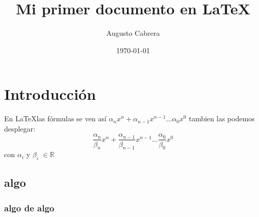 \documentclass[]{article}
\title{Mi primer documento en \LaTeX}
\author{Augusto Cabrera}
\date{\today}
\begin{document}
\maketitle

\section{Introducción}

En \LaTeX las fórmulas se ven así $\alpha_{n} x^n+\alpha_{n-1}x^{n-1}\dots\alpha_{0}x^{0}$ tambien las podemos desplegar:
$$
\frac{\alpha_{n}}{\beta_{n}}x^n+\frac{\alpha_{n-1}}{\beta_{n-1}}x^{n-1}\dots\frac{\alpha_{0}}{\beta_{0}}x^{0}
$$
con $\alpha_{i}$ y $\beta_{i}$ $\in\mathbb{R}$

\subsection{algo}
\subsubsection{algo de algo}
\end{document}
